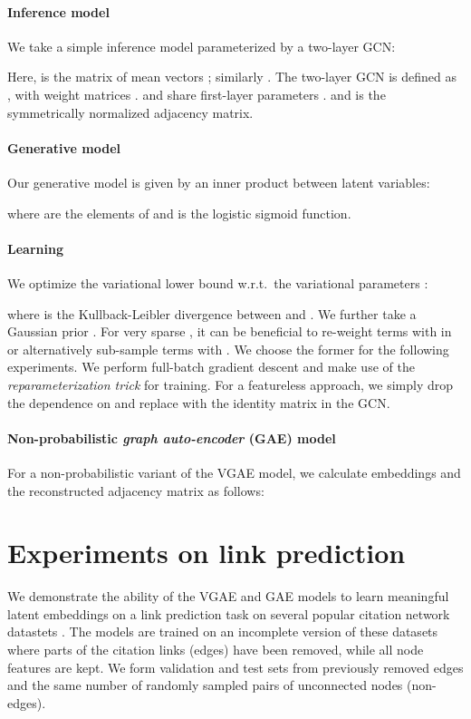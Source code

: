 \documentclass{article}
\begin{document}
\paragraph{Inference model}
We take a simple inference model parameterized by a two-layer GCN:

Here,  is the matrix of mean vectors ; similarly . The two-layer GCN is defined as , with weight matrices .   and  share first-layer parameters .  and  is the symmetrically normalized adjacency matrix.

\paragraph{Generative model}
Our generative model is given by an inner product between latent variables:

where  are the elements of  and  is the logistic sigmoid function.

\paragraph{Learning}
We optimize the variational lower bound  w.r.t.~the variational parameters :

where  is the Kullback-Leibler divergence between  and . We further take a Gaussian prior . For very sparse , it can be beneficial to re-weight terms with  in  or alternatively sub-sample terms with . We choose the former for the following experiments. We perform full-batch gradient descent and make use of the \emph{reparameterization trick} \cite{kingma2013auto} for training. For a featureless approach, we simply drop the dependence on  and replace  with the identity matrix in the GCN. 

\paragraph{Non-probabilistic \emph{graph auto-encoder} (GAE) model}
For a non-probabilistic variant of the VGAE model, we calculate embeddings  and the reconstructed adjacency matrix  as follows:


\section{Experiments on link prediction}
We demonstrate the ability of the VGAE and GAE models to learn meaningful latent embeddings on a link prediction task on several popular citation network datastets \cite{aimag08}. The models are trained on an incomplete version of these datasets where parts of the citation links (edges) have been removed, while all node features are kept. We form validation and test sets from previously removed edges and the same number of randomly sampled pairs of unconnected nodes (non-edges).
\end{document}
